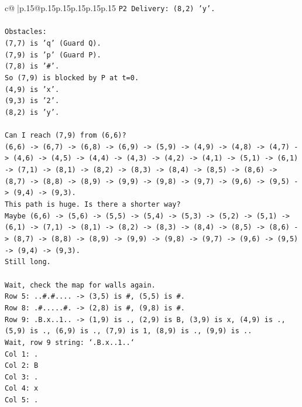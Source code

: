 \documentclass{article}
\begin{document}
{\begin{supertabular}{c@{$\;$}|p{.15\linewidth}@{}p{.15\linewidth}p{.15\linewidth}p{.15\linewidth}p{.15\linewidth}p{.15\linewidth}}
{{{\texttt{P2 Delivery: (8,2) 'y'.} \\
\\ 
\texttt{Obstacles:} \\
\texttt{(7,7) is 'q' (Guard Q).} \\
\texttt{(7,9) is 'p' (Guard P).} \\
\texttt{(7,8) is '\#'.} \\
\texttt{So (7,9) is blocked by P at t=0.} \\
\texttt{(4,9) is 'x'.} \\
\texttt{(9,3) is '2'.} \\
\texttt{(8,2) is 'y'.} \\
\\ 
\texttt{Can I reach (7,9) from (6,6)?} \\
\texttt{(6,6) {-}> (6,7) {-}> (6,8) {-}> (6,9) {-}> (5,9) {-}> (4,9) {-}> (4,8) {-}> (4,7) {-}> (4,6) {-}> (4,5) {-}> (4,4) {-}> (4,3) {-}> (4,2) {-}> (4,1) {-}> (5,1) {-}> (6,1) {-}> (7,1) {-}> (8,1) {-}> (8,2) {-}> (8,3) {-}> (8,4) {-}> (8,5) {-}> (8,6) {-}> (8,7) {-}> (8,8) {-}> (8,9) {-}> (9,9) {-}> (9,8) {-}> (9,7) {-}> (9,6) {-}> (9,5) {-}> (9,4) {-}> (9,3).} \\
\texttt{This path is huge. Is there a shorter way?} \\
\texttt{Maybe (6,6) {-}> (5,6) {-}> (5,5) {-}> (5,4) {-}> (5,3) {-}> (5,2) {-}> (5,1) {-}> (6,1) {-}> (7,1) {-}> (8,1) {-}> (8,2) {-}> (8,3) {-}> (8,4) {-}> (8,5) {-}> (8,6) {-}> (8,7) {-}> (8,8) {-}> (8,9) {-}> (9,9) {-}> (9,8) {-}> (9,7) {-}> (9,6) {-}> (9,5) {-}> (9,4) {-}> (9,3).} \\
\texttt{Still long.} \\
\\ 
\texttt{Wait, check the map for walls again.} \\
\texttt{Row 5: ..\#.\#.... {-}> (3,5) is \#, (5,5) is \#.} \\
\texttt{Row 8: .\#.....\#. {-}> (2,8) is \#, (9,8) is \#.} \\
\texttt{Row 9: .B.x..1.. {-}> (1,9) is ., (2,9) is B, (3,9) is x, (4,9) is ., (5,9) is ., (6,9) is ., (7,9) is 1, (8,9) is ., (9,9) is ..} \\
\texttt{Wait, row 9 string: `.B.x..1..`} \\
\texttt{Col 1: .} \\
\texttt{Col 2: B} \\
\texttt{Col 3: .} \\
\texttt{Col 4: x} \\
\texttt{Col 5: .} \\
}}}
\end{supertabular}}
\end{document}
